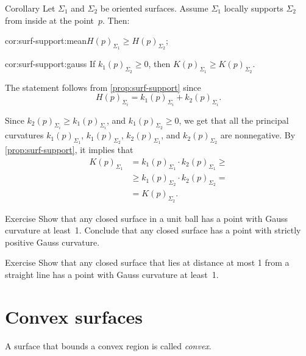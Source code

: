 \begin{thm}{Corollary}\label{cor:surf-support}
Let $\Sigma_1$ and $\Sigma_2$ be oriented surfaces.
Assume $\Sigma_1$ locally supports $\Sigma_2$ from inside at the point~$p$.
Then:

\begin{subthm}{cor:surf-support:mean}$H(p)_{\Sigma_1}\ge H(p)_{\Sigma_2}$;
\end{subthm}

\begin{subthm}{cor:surf-support:gauss} If $k_1(p)_{\Sigma_2}\ge 0$, then $K(p)_{\Sigma_1}\ge K(p)_{\Sigma_2}$.
\end{subthm}
 
\end{thm}

The statement follows from  \ref{prop:surf-support} since 
\[H(p)_{\Sigma_i}=k_1(p)_{\Sigma_i}+k_2(p)_{\Sigma_i}.\]


 Since $k_2(p)_{\Sigma_i}\ge k_1(p)_{\Sigma_i}$, and $k_1(p)_{\Sigma_2}\ge 0$, we get that all the principal curvatures 
$k_1(p)_{\Sigma_1}$, 
$k_1(p)_{\Sigma_2}$, 
$k_2(p)_{\Sigma_1}$, and 
$k_2(p)_{\Sigma_2}$ are nonnegative.
By \ref{prop:surf-support}, it implies that
\begin{align*}
K(p)_{\Sigma_1}&=k_1(p)_{\Sigma_1}\cdot k_2(p)_{\Sigma_1}\ge 
\\
&\ge k_1(p)_{\Sigma_2}\cdot k_2(p)_{\Sigma_2}=
\\
&=K(p)_{\Sigma_2}.
\end{align*}
\qedsf

\begin{thm}{Exercise}\label{ex:positive-gauss-0}
Show that any closed surface in a unit ball has a point with Gauss curvature at least~1.
Conclude that any closed surface has a point with strictly positive Gauss curvature.
\end{thm}

\begin{thm}{Exercise}\label{ex:positive-gauss}
Show that any closed surface that lies at distance at most 1 from a straight line has a point with Gauss curvature at least~1.
\end{thm}

\section{Convex surfaces}

A surface that bounds a convex region is called \emph{convex}.

